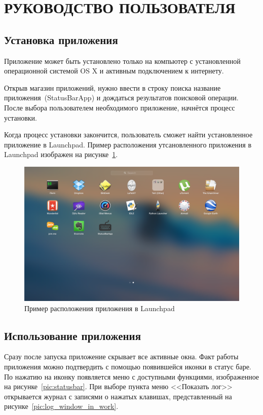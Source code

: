 \section[Руководство пользователя]{РУКОВОДСТВО ПОЛЬЗОВАТЕЛЯ}
\label{sec:user_manual}

\subsection{Установка приложения}

Приложение может быть установлено только на компьютер с установленной
операционной системой OS X и активным подключением к интернету.

Открыв магазин приложений, нужно ввести в строку поиска название
приложения~(StatusBarApp) и дождаться результатов поисковой операции.
После выбора пользователем необходимого приложение, начнётся процесс установки.

Когда процесс установки закончится, пользователь сможет найти установленное
приложение в Launchpad. Пример расположения утсановленного приложения
в Launchpad изображен на рисунке~\ref{pic:launchpad}.

\begin{figure}[h!]
  \centering
  \includegraphics[width=150mm]{pic/launchpad.png}
  \caption{Пример расположения приложения в Launchpad}
  \label{pic:launchpad}
\end{figure}

\newpage

\subsection{Использование приложения}

Сразу после запуска приложение скрывает все активные окна. Факт работы
приложения можно подтвердить с помощью появившейся иконки в статус баре.
По нажатию на иконку появляется меню с доступными функциями, изображенное
на рисунке~\ref{pic:statusbar}. При выборе пункта меню <<Показать лог>>
открывается журнал с записями о нажатых клавишах, представленный
на рисунке~\ref{pic:log_window_in_work}.


